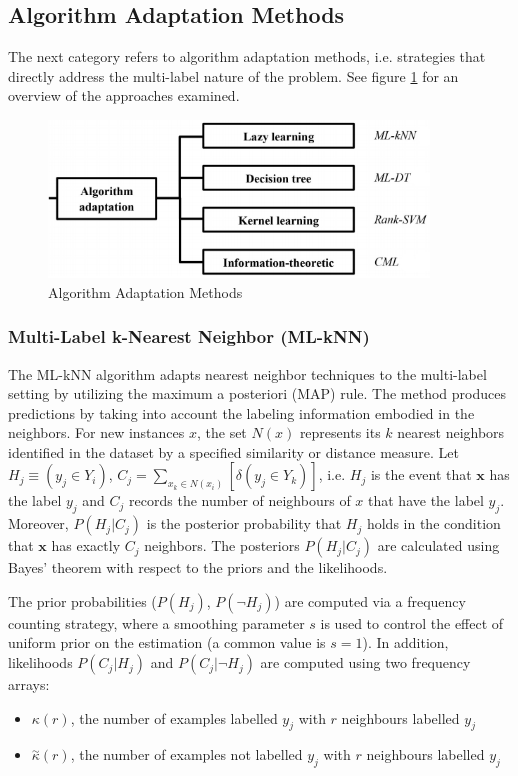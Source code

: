 \documentclass[12pt]{report}
\begin{document}
	\subsection*{Algorithm Adaptation Methods}
  The next category refers to algorithm adaptation methods, i.e. strategies that
  directly address the multi-label nature of the problem. See figure
  \ref{figure:aam} for an overview of the approaches examined.

	
	\begin{figure}[H]
		\centering
		\includegraphics[width=0.9\textwidth]{aa.png}
		\caption{Algorithm Adaptation Methods}
		\centering
    \label{figure:aam}
	\end{figure}

	\subsubsection*{Multi-Label k-Nearest Neighbor (ML-kNN)}
	The ML-kNN algorithm adapts nearest neighbor techniques to the multi-label
  setting by utilizing the maximum a posteriori (MAP) rule. The method produces
  predictions by taking into account the labeling information embodied in the neighbors. For new
  instances $x$, the set $N(x)$ represents its $k$ nearest neighbors
  identified in the dataset by a specified similarity or distance measure. Let
  $H_j \equiv (y_j \in Y_i)$, $C_j = \sum_{x_k \in N(x_i)} [\delta(y_j \in
  Y_k)]$, i.e. $H_j$ is the event that $\textbf{x}$ has the label $y_j$ and
  $C_j$ records the number of neighbours of $x$ that have the label $y_j$. Moreover,
  $P(H_j|C_j)$ is the posterior probability that $H_j$ holds in the condition
  that $\textbf{x}$ has exactly $C_j$ neighbors. The posteriors $P(H_j|C_j)$ are
  calculated using Bayes' theorem with respect to the priors and the likelihoods.

	The prior probabilities ($P(H_j)$, $P(\neg H_j)$) are computed via a frequency
  counting strategy, where a smoothing parameter $s$ is used to control the
  effect of uniform prior on the estimation (a common value is  $s=1$). In addition, likelihoods $P(C_j|H_j)$ and $P(C_j| \neg H_j)$ are computed using two frequency arrays:
	\begin{itemize}
		\item $\kappa(r)$, the number of examples labelled $y_j$ with $r$ neighbours labelled $y_j$
		\item $\overset{\sim}{\kappa}(r)$, the number of examples not labelled $y_j$ with $r$ neighbours labelled $y_j$
	\end{itemize}
	 
\end{document}
